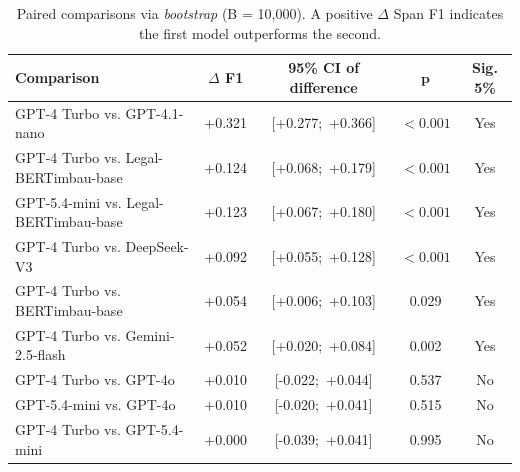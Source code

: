 \begin{table}[ht]
    \centering
    \caption{Paired comparisons via \textit{bootstrap} (B = 10,000). A positive $\Delta$ Span F1 indicates the first model outperforms the second.}
    \label{tab:bootstrap_paired}
    \small
    \begin{tabular}{lcccc}
        \hline
        \textbf{Comparison} & $\Delta$ \textbf{F1} & \textbf{95\% CI of difference} & $\mathbf{p}$ & \textbf{Sig. 5\%} \\
        \hline
        GPT-4 Turbo vs. GPT-4.1-nano & +0.321 & [+0.277;\ +0.366] & $< 0.001$ & Yes \\
        GPT-4 Turbo vs. Legal-BERTimbau-base & +0.124 & [+0.068;\ +0.179] & $< 0.001$ & Yes \\
        GPT-5.4-mini vs. Legal-BERTimbau-base & +0.123 & [+0.067;\ +0.180] & $< 0.001$ & Yes \\
        GPT-4 Turbo vs. DeepSeek-V3 & +0.092 & [+0.055;\ +0.128] & $< 0.001$ & Yes \\
        GPT-4 Turbo vs. BERTimbau-base & +0.054 & [+0.006;\ +0.103] & 0.029 & Yes \\
        GPT-4 Turbo vs. Gemini-2.5-flash & +0.052 & [+0.020;\ +0.084] & 0.002 & Yes \\
        GPT-4 Turbo vs. GPT-4o & +0.010 & [-0.022;\ +0.044] & 0.537 & No \\
        GPT-5.4-mini vs. GPT-4o & +0.010 & [-0.020;\ +0.041] & 0.515 & No \\
        GPT-4 Turbo vs. GPT-5.4-mini & +0.000 & [-0.039;\ +0.041] & 0.995 & No \\
        \hline
    \end{tabular}
\end{table}
